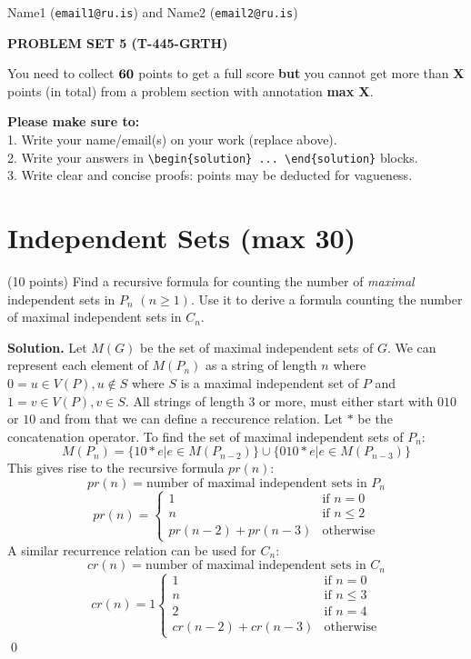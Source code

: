 \documentclass[a4paper,11pt]{amsart}
\newcounter{temp}
\newcounter{prob_counter}
\newenvironment{problem}
{\begin{list}{{\bf \arabic{prob_counter}}}{
      \usecounter{prob_counter}
      \addtolength{\labelsep}{.6ex}
      \addtolength{\itemsep}{4.3ex}
      \setlength{\leftmargin}{1.4em}}
      \setcounter{prob_counter}{\value{temp}}
}
{\setcounter{temp}{\value{prob_counter}}
  \end{list}
}
\newenvironment{solution}{\textbf{Solution.}}{\qed}
\newcommand{\rubrik}[1]{\bigskip \begin{center}{\bf #1}\end{center} \medskip}
\begin{document}
\pagestyle{empty}
\thispagestyle{empty}

{\small{\sc\noindent
        Name1 ({\tt email1@ru.is}) and Name2 ({\tt email2@ru.is})
}}

\rubrik{PROBLEM SET 5 (T-445-GRTH)}

You need to collect $\bf 60$ points to get a full score {\bf but} you cannot get more than {\bf X} points (in total) from a problem section with annotation {\bf max X}.

{\bf Please make sure to:}\\
1. Write your name/email(s) on your work (replace above).\\
2. Write your answers in \texttt{{\textbackslash}begin\{solution\} ... {\textbackslash}end\{solution\}} blocks.\\
3. Write clear and concise proofs: points may be deducted for vagueness.




\section{Independent Sets ({\bf max 30})}

\begin{problem}
 \item (10 points) Find a recursive formula for counting the number of \emph{maximal} independent sets in $P_n$ $(n\ge 1)$. Use it to derive a formula counting the number of maximal independent sets in $C_n$.
\end{problem}

\begin{solution}
  Let $M(G)$ be the set of maximal independent sets of $G$.
  We can represent each element of  $M(P_n)$ as a string of length $n$ where $0 = u \in V(P), u \notin S$ where $S$ is a maximal independent set of $P$ and $1 = v \in V(P), v \in S$. All strings of length $3$ or more, must either start with $010$ or $10$ and from that we can define a reccurence relation. Let $*$ be the concatenation operator. To find the set of maximal independent sets of $P_n$:
  \[M(P_n) = \{10 * e | e \in M(P_{n-2})\} \cup \{010 * e | e \in M(P_{n-3})\}\]
  This gives rise to the recursive formula $pr(n)$:
  \[ pr(n) = \text{number of maximal independent sets in } P_n \]
  \[
    pr(n) =
    \begin{cases}
      1 & \text{if } n = 0\\
      n & \text{if } n \leq 2\\
      pr(n-2) + pr(n-3) & \text{otherwise}
    \end{cases}
  \]
  A similar recurrence relation can be used for $C_n$:
  \[ cr(n) = \text{number of maximal independent sets in } C_n \]
  \[ cr(n) = 1
    \begin{cases}
      1 & \text{if } n = 0\\
      n & \text{if } n \leq 3\\
      2 & \text{if } n = 4\\
      cr(n-2) + cr(n-3) & \text{otherwise}
    \end{cases}
  \]
\end{solution}
\end{document}
